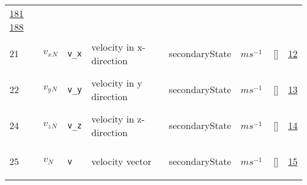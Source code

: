 \begin{longtable}{|p{1cm}|p{3cm}|p{3cm}|p{7cm}|p{3.0cm}|p{3cm}|p{2cm}|p{1cm}|}
                 \hyperlink{"e:181"}{ 181 }
                 \hyperlink{"e:188"}{ 188 }
                 \\
    21
             & \hypertarget{"v:21"}{ $ {v_x}{_{N}} $}
             & \verb|v_x|
             & velocity in x-direction
             & \begin{lay}secondaryState \end{lay}
             & $ m s^{-1} \, $
             & []
             & \hyperlink{"e:12"}{ 12 }
                 \\
    22
             & \hypertarget{"v:22"}{ $ {v_y}{_{N}} $}
             & \verb|v_y|
             & velocity in y direction
             & \begin{lay}secondaryState \end{lay}
             & $ m s^{-1} \, $
             & []
             & \hyperlink{"e:13"}{ 13 }
                 \\
    24
             & \hypertarget{"v:24"}{ $ {v_z}{_{N}} $}
             & \verb|v_z|
             & velocity in z-direction
             & \begin{lay}secondaryState \end{lay}
             & $ m s^{-1} \, $
             & []
             & \hyperlink{"e:14"}{ 14 }
                 \\
    25
             & \hypertarget{"v:25"}{ $ {v}{_{N}} $}
             & \verb|v|
             & velocity vector
             & \begin{lay}secondaryState \end{lay}
             & $ m s^{-1} \, $
             & []
             & \hyperlink{"e:15"}{ 15 }
                 \\
    \end{longtable}